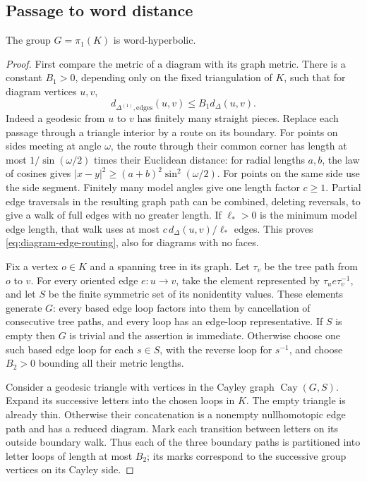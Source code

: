 \subsection{Passage to word distance}

\begin{proposition}
\label{prop:word-hyperbolicity}
The group $G=\pi_1(K)$ is word-hyperbolic.
\end{proposition}

\begin{proof}
First compare the metric of a diagram with its graph metric. There is a
constant $B_1>0$, depending only on the fixed triangulation of $K$, such
that for diagram vertices $u,v$,
\begin{equation}
 d_{\Delta^{(1)},\mathrm{edges}}(u,v)\le B_1d_\Delta(u,v).
 \label{eq:diagram-edge-routing}
\end{equation}
Indeed a geodesic from $u$ to $v$ has finitely many straight pieces.
Replace each passage through a triangle interior by a route on its
boundary. For points on sides meeting at angle $\omega$, the route
through their common corner has length at most
$1/\sin(\omega/2)$ times their Euclidean distance: for radial lengths
$a,b$, the law of cosines gives
$|x-y|^2\ge(a+b)^2\sin^2(\omega/2)$.
For points on the same side use the side segment. Finitely many model
angles give one length factor $c\ge1$. Partial edge traversals in the
resulting graph path can be combined, deleting reversals, to give a
walk of full edges with no greater length. If $\ell_*>0$ is the minimum
model edge length, that walk uses at most
$c\,d_\Delta(u,v)/\ell_*$ edges. This proves
\eqref{eq:diagram-edge-routing}, also for diagrams with no faces.

Fix a vertex $o\in K$ and a spanning tree in its graph. Let $\tau_v$
be the tree path from $o$ to $v$. For every oriented edge $e:u\to v$,
take the element represented by $\tau_u e\tau_v^{-1}$, and let $S$ be
the finite symmetric set of its nonidentity values. These elements
generate $G$: every based edge loop factors into them by cancellation
of consecutive tree paths, and every loop has an edge-loop
representative. If $S$ is empty then $G$ is trivial and the assertion
is immediate. Otherwise choose one such based edge loop for each
$s\in S$, with the reverse loop for $s^{-1}$, and choose $B_2>0$
bounding all their metric lengths.

Consider a geodesic triangle with vertices in the Cayley graph
$\operatorname{Cay}(G,S)$. Expand its successive letters into the chosen
loops in $K$. The empty triangle is already thin. Otherwise their
concatenation is a nonempty nullhomotopic edge path and has a reduced
diagram. Mark each transition between letters on its
outside boundary walk. Thus each of the three boundary paths is
partitioned into letter loops of length at most $B_2$; its marks
correspond to the successive group vertices on its Cayley side.


\end{proof}
